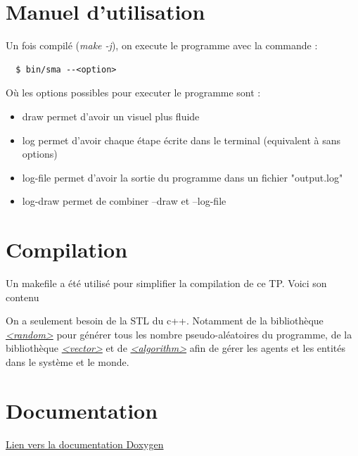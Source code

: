 \documentclass[a4paper, 12pt]{article}
\newcommand{\changeurlcolor}[1]{\hypersetup{urlcolor=#1}}
\begin{document}
\newpage
\appendix
\section{Manuel d'utilisation}
Un fois compilé (\emph{make -j}), on execute le programme avec la commande :
\begin{lstlisting}
  $ bin/sma --<option>
\end{lstlisting}
Où les options possibles pour executer le programme sont :
\begin{itemize}
  \item draw permet d'avoir un visuel plus fluide
  \item log permet d'avoir chaque étape écrite dans le terminal (equivalent à sans options)
  \item log-file permet d'avoir la sortie du programme dans un fichier "output.log"
  \item log-draw permet de combiner --draw et --log-file
\end{itemize}

\section{Compilation}
Un makefile a été utilisé pour simplifier la compilation de ce TP. Voici son contenu


On a seulement besoin de la STL du c++. Notamment de la bibliothèque \href{https://en.cppreference.com/w/cpp/numeric/random}{\emph{<random>}}
pour générer tous les nombre pseudo-aléatoires du programme, de la bibliothèque \href{https://en.cppreference.com/w/cpp/container/vector}{\emph{<vector>}}
et de \href{https://en.cppreference.com/w/cpp/algorithm}{\emph{<algorithm>}} afin de gérer les agents et les entités dans le système et le monde.

\section{Documentation}
\changeurlcolor{blue}\href{run:../Documentation/latex/refman.pdf}{Lien vers la documentation Doxygen}
\end{document}
